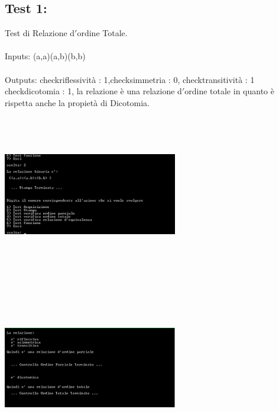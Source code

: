 \documentclass[11pt, a4paper, titlepage, block]{article}
\begin{document}
	\subsection{Test 1:}
	Test di Relazione d$'$ordine Totale.\\
	\\
	Inputs: (a,a)(a,b)(b,b)\\
	\\
	Outputs: checkriflessivit\`a : 1,checksimmetria : 0, checktransitivit\`a : 1
	checkdicotomia : 1, la relazione \`e una relazione d$'$ordine totale in quanto \`e rispetta anche la propiet\`a di Dicotomia.\\
	\includegraphics[width=3in,height=3in,viewport=0 0 300 300]{../Screenshots/Test1Input.jpg}
	\\
	\includegraphics[width=3in,height=3in,viewport=0 0 300 300]{../Screenshots/Test1Output.png}
	\newpage
\end{document}
